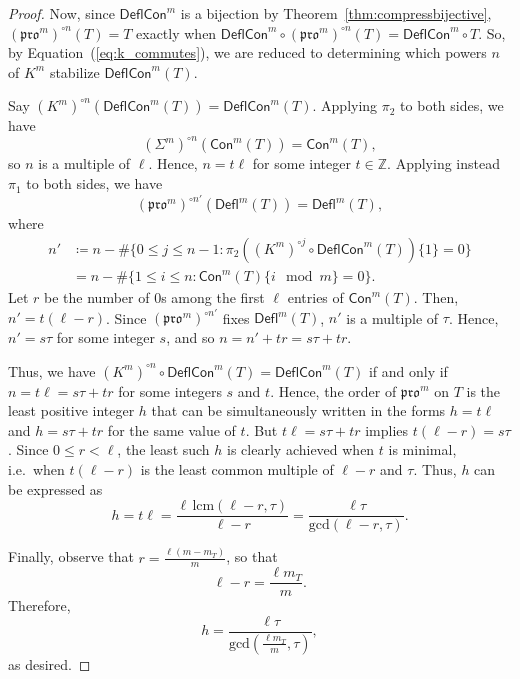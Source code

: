 \documentclass[12pt]{amsart}
\theoremstyle{definition}
\theoremstyle{remark}
\numberwithin{equation}{section}
\newcommand{\pro}{\mathfrak{pro}}
\newcommand{\deflate}{\ensuremath{\mathsf{Defl}}}
\newcommand{\content}{\ensuremath{\mathsf{Con}}}
\newcommand{\compress}{\ensuremath{\mathsf{DeflCon}}}
\begin{document}
\begin{proof}
Now, since $\compress^m$ is a bijection by Theorem~\ref{thm:compressbijective}, $(\pro^m)^{\circ n}(T) = T$ exactly when $\compress^m \circ (\pro^m)^{\circ n}(T) = \compress^m \circ T$. So, by Equation~(\ref{eq:k_commutes}), we are reduced to determining which powers $n$ of $K^m$ stabilize $\compress^m(T)$.
 

 
Say $(K^m)^{\circ n}(\compress^m(T)) = \compress^m(T)$. Applying $\pi_2$ to both sides, we have \[ (\Sigma^m)^{\circ n}(\content^m(T)) = \content^m(T), \] so $n$ is a multiple of $\ell$. Hence, $n = t \ell$ for some integer $t \in \mathbb{Z}$.  Applying instead $\pi_1$ to both sides, we have \[ (\pro^m)^{\circ n'}(\deflate^m(T)) = \deflate^m(T), \] where 
\begin{align*}
n' &\coloneqq n - \# \{ 0 \leq j \leq n-1 : \pi_2 ((K^m)^{\circ j} \circ \compress^m(T)) \lbrace 1 \rbrace = 0\} \\
&= n - \#  \{ 1 \leq i \leq n : \content^m(T) \lbrace i \mod m \rbrace = 0\}.
\end{align*}
Let $r$ be the number of $0$s among the first $\ell$ entries of $\content^m(T)$. Then, $n' = t(\ell - r)$. Since $(\pro^m)^{\circ n'}$ fixes $\deflate^m(T)$, $n'$ is a multiple of $\tau$. Hence, $n' = s \tau$ for some integer $s$, and so $n = n' + tr = s\tau + tr$.

Thus, we have $(K^m)^{\circ n}  \circ \compress^m(T) = \compress^m(T)$ if and only if $n = t \ell = s \tau + t  r$ for some integers $s$ and $t$. Hence, the order of $\pro^m$ on $T$ is the least positive integer $h$ that can be simultaneously written in the forms $h = t \ell$ and $h=s \tau + t r$ for the same value of $t$. But $t \ell = s\tau + tr$ implies $t(\ell-r) = s\tau$. Since $0 \leq r < \ell$, the least such $h$ is clearly achieved when $t$ is minimal, i.e.\ when $t(\ell-r)$ is the least common multiple of $\ell-r$ and $\tau$. Thus, $h$ can be expressed as 
\begin{equation}\label{eq:period}
h = t \ell = \frac{\ell \, \text{lcm}(\ell-r,\tau)}{\ell-r} = \frac{\ell \tau}{\text{gcd}(\ell-r,\tau)}.
\end{equation}

Finally, observe that $r = \frac{\ell (m-m_T)}{m}$, so that \[ \ell - r = \frac{\ell m_T}{m}.\]
Therefore,
\[ h = \frac{\ell \tau}{\text{gcd}(\frac{\ell m_T}{m},\tau)}, \]
as desired. 
\end{proof}
\end{document}
